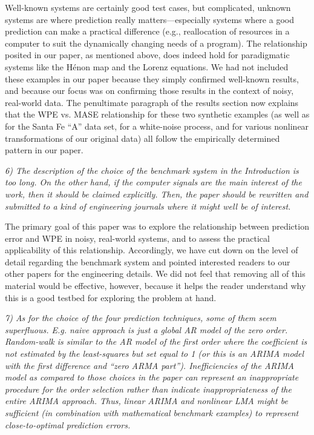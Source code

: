\documentclass[12pt]{article}
\begin{document}
Well-known systems are certainly good test cases, but complicated,
unknown systems are where prediction really matters---especially
systems where a good prediction can make a practical difference (e.g.,
reallocation of resources in a computer to suit the dynamically
changing needs of a program).  The relationship posited in our paper,
as mentioned above, does indeed hold for paradigmatic systems like the
H\'{e}non map and the Lorenz equations.  We had not included these
examples in our paper because they simply confirmed well-known
results, and because our focus was on confirming those results in the
context of noisy, real-world data.  The penultimate paragraph of the
results section now explains that the WPE vs. MASE relationship for
these two synthetic examples (as well as for the Santa Fe ``A'' data
set, for a white-noise process, and for various nonlinear
transformations of our original data) all follow the empirically
determined pattern in our paper.

\smallskip

\emph{6) The description of the choice of the benchmark system in the
  Introduction is too long. On the other hand, if the computer signals
  are the main interest of the work, then it should be claimed
  explicitly. Then, the paper should be rewritten and submitted to a
  kind of engineering journals where it might well be of interest.}

The primary goal of this paper was to explore the relationship between
prediction error and WPE in noisy, real-world systems, and to assess
the practical applicability of this relationship.  Accordingly, we
have cut down on the level of detail regarding the benchmark system
and pointed interested readers to our other papers for the engineering
details.  We did not feel that removing all of this material would be
effective, however, because it helps the reader understand why this is
a good testbed for exploring the problem at hand.

\smallskip

\emph{7) As for the choice of the four prediction techniques, some of
  them seem superfluous. E.g. naive approach is just a global AR model
  of the zero order.  Random-walk is similar to the AR model of the
  first order where the coefficient is not estimated by the
  least-squares but set equal to 1 (or this is an ARIMA model with the
  first difference and ``zero ARMA part''). Inefficiencies of the
  ARIMA model as compared to those choices in the paper can represent
  an inappropriate procedure for the order selection rather than
  indicate inappropriateness of the entire ARIMA approach. Thus,
  linear ARIMA and nonlinear LMA might be sufficient (in combination
  with mathematical benchmark examples) to represent close-to-optimal
  prediction errors.}
\end{document}
